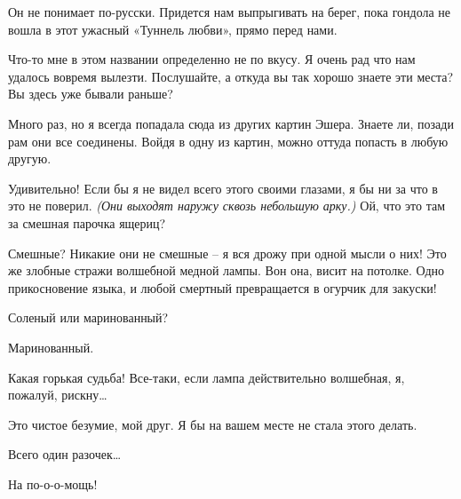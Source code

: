 \documentclass[../main.tex]{subfiles}
\begin{document}
\begin{Dialogue}
\begin{sublevel}
\begin{sublevel}

 Он не понимает по-русски. Придется нам выпрыгивать на берег, пока гондола не вошла в этот ужасный «Туннель любви», прямо перед нами.


 Что-то мне в этом названии определенно не по вкусу. Я очень рад что нам удалось вовремя вылезти. Послушайте, а откуда вы так хорошо знаете эти места? Вы здесь уже бывали раньше?

 Много раз, но я всегда попадала сюда из других картин Эшера. Знаете ли, позади рам они все соединены. Войдя в одну из картин, можно оттуда попасть в любую другую.

 Удивительно! Если бы я не видел всего этого своими глазами, я бы ни за что в это не поверил. \emph{(Они выходят наружу сквозь небольшую арку.)} Ой, что это там за смешная парочка ящериц?

 Смешные? Никакие они не смешные \--- я вся дрожу при одной мысли о них! Это же злобные стражи волшебной медной лампы. Вон она, висит на потолке. Одно прикосновение языка, и любой смертный превращается в огурчик для закуски!

 Соленый или маринованный?

 Маринованный.

 Какая горькая судьба! Все-таки, если лампа действительно волшебная, я, пожалуй, рискну\ldots{}

 Это чистое безумие, мой друг. Я бы на вашем месте не стала этого делать.

 Всего один разочек\ldots{}


 На по-о-о-мощь!


\end{sublevel}
\end{sublevel}
\end{Dialogue}
\end{document}
